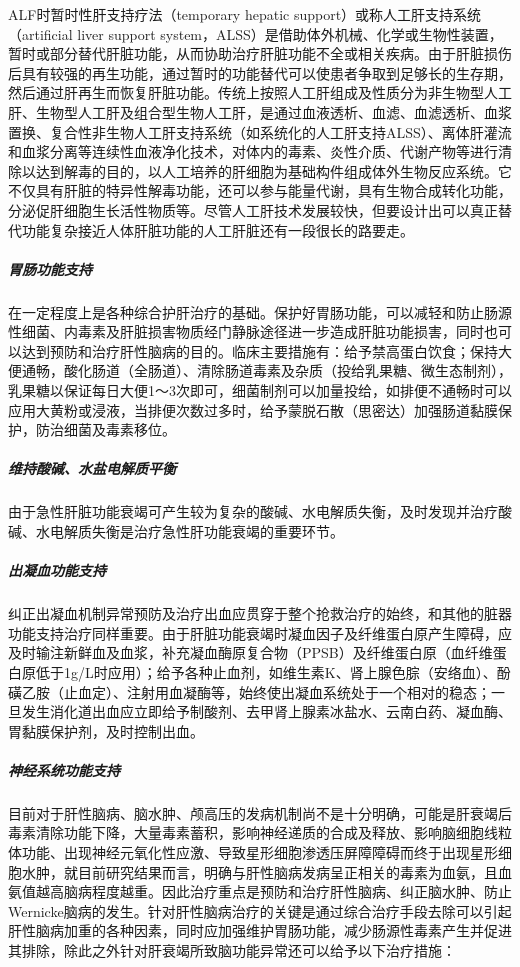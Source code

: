 ALF时暂时性肝支持疗法（temporary hepatic
support）或称人工肝支持系统（artificial liver support
system，ALSS）是借助体外机械、化学或生物性装置，暂时或部分替代肝脏功能，从而协助治疗肝脏功能不全或相关疾病。由于肝脏损伤后具有较强的再生功能，通过暂时的功能替代可以使患者争取到足够长的生存期，然后通过肝再生而恢复肝脏功能。传统上按照人工肝组成及性质分为非生物型人工肝、生物型人工肝及组合型生物人工肝，是通过血液透析、血滤、血滤透析、血浆置换、复合性非生物人工肝支持系统（如系统化的人工肝支持ALSS）、离体肝灌流和血浆分离等连续性血液净化技术，对体内的毒素、炎性介质、代谢产物等进行清除以达到解毒的目的，以人工培养的肝细胞为基础构件组成体外生物反应系统。它不仅具有肝脏的特异性解毒功能，还可以参与能量代谢，具有生物合成转化功能，分泌促肝细胞生长活性物质等。尽管人工肝技术发展较快，但要设计出可以真正替代功能复杂接近人体肝脏功能的人工肝脏还有一段很长的路要走。

\subparagraph{胃肠功能支持}

在一定程度上是各种综合护肝治疗的基础。保护好胃肠功能，可以减轻和防止肠源性细菌、内毒素及肝脏损害物质经门静脉途径进一步造成肝脏功能损害，同时也可以达到预防和治疗肝性脑病的目的。临床主要措施有：给予禁高蛋白饮食；保持大便通畅，酸化肠道（全肠道）、清除肠道毒素及杂质（投给乳果糖、微生态制剂），乳果糖以保证每日大便1～3次即可，细菌制剂可以加量投给，如排便不通畅时可以应用大黄粉或浸液，当排便次数过多时，给予蒙脱石散（思密达）加强肠道黏膜保护，防治细菌及毒素移位。

\subparagraph{维持酸碱、水盐电解质平衡}

由于急性肝脏功能衰竭可产生较为复杂的酸碱、水电解质失衡，及时发现并治疗酸碱、水电解质失衡是治疗急性肝功能衰竭的重要环节。

\subparagraph{出凝血功能支持}

纠正出凝血机制异常预防及治疗出血应贯穿于整个抢救治疗的始终，和其他的脏器功能支持治疗同样重要。由于肝脏功能衰竭时凝血因子及纤维蛋白原产生障碍，应及时输注新鲜血及血浆，补充凝血酶原复合物（PPSB）及纤维蛋白原（血纤维蛋白原低于1g/L时应用）；给予各种止血剂，如维生素K、肾上腺色腙（安络血）、酚磺乙胺（止血定）、注射用血凝酶等，始终使出凝血系统处于一个相对的稳态；一旦发生消化道出血应立即给予制酸剂、去甲肾上腺素冰盐水、云南白药、凝血酶、胃黏膜保护剂，及时控制出血。

\subparagraph{神经系统功能支持}

目前对于肝性脑病、脑水肿、颅高压的发病机制尚不是十分明确，可能是肝衰竭后毒素清除功能下降，大量毒素蓄积，影响神经递质的合成及释放、影响脑细胞线粒体功能、出现神经元氧化性应激、导致星形细胞渗透压屏障障碍而终于出现星形细胞水肿，就目前研究结果而言，明确与肝性脑病发病呈正相关的毒素为血氨，且血氨值越高脑病程度越重。因此治疗重点是预防和治疗肝性脑病、纠正脑水肿、防止Wernicke脑病的发生。针对肝性脑病治疗的关键是通过综合治疗手段去除可以引起肝性脑病加重的各种因素，同时应加强维护胃肠功能，减少肠源性毒素产生并促进其排除，除此之外针对肝衰竭所致脑功能异常还可以给予以下治疗措施：

